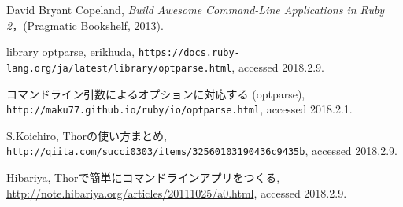 
\begin{thebibliography}{9}
  David Bryant Copeland, {\it Build Awesome Command-Line Applications in Ruby 2}，(Pragmatic Bookshelf, 2013).

 library optparse, erikhuda, 
\texttt{https://docs.ruby-lang.org/ja/latest/library\slash optparse.html}, 
accessed 2018.2.9.

 コマンドライン引数によるオプションに対応する (optparse),
\texttt{http://maku77.github.io/ruby/io/optparse.html}, 
accessed 2018.2.1.

 S.Koichiro,
Thorの使い方まとめ,
\texttt{http://qiita.com/succi0303/items\slash32560103190436c9435b}, 
accessed 2018.2.9.

 Hibariya,
Thorで簡単にコマンドラインアプリをつくる,
\url{http://note.hibariya.org/articles/20111025/a0.html}, 
accessed 2018.2.9.
\end{thebibliography}


    

